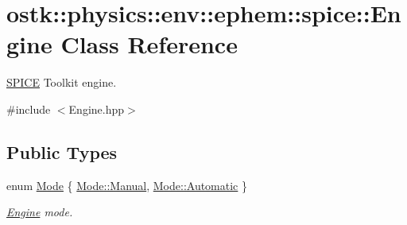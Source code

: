 \hypertarget{classostk_1_1physics_1_1env_1_1ephem_1_1spice_1_1_engine}{}\section{ostk\+:\+:physics\+:\+:env\+:\+:ephem\+:\+:spice\+:\+:Engine Class Reference}
\label{classostk_1_1physics_1_1env_1_1ephem_1_1spice_1_1_engine}


\hyperlink{classostk_1_1physics_1_1env_1_1ephem_1_1_s_p_i_c_e}{S\+P\+I\+CE} Toolkit engine.  




{\ttfamily \#include $<$Engine.\+hpp$>$}

\subsection*{Public Types}
\begin{DoxyCompactItemize}
\item 
enum \hyperlink{classostk_1_1physics_1_1env_1_1ephem_1_1spice_1_1_engine_a803b82d8f41c81e861852098b6b75ae2}{Mode} \{ \hyperlink{classostk_1_1physics_1_1env_1_1ephem_1_1spice_1_1_engine_a803b82d8f41c81e861852098b6b75ae2ae1ba155a9f2e8c3be94020eef32a0301}{Mode\+::\+Manual}, 
\hyperlink{classostk_1_1physics_1_1env_1_1ephem_1_1spice_1_1_engine_a803b82d8f41c81e861852098b6b75ae2a086247a9b57fde6eefee2a0c4752242d}{Mode\+::\+Automatic}
 \}\begin{DoxyCompactList}\small\item\em \hyperlink{classostk_1_1physics_1_1env_1_1ephem_1_1spice_1_1_engine}{Engine} mode. \end{DoxyCompactList}
\end{DoxyCompactItemize}
